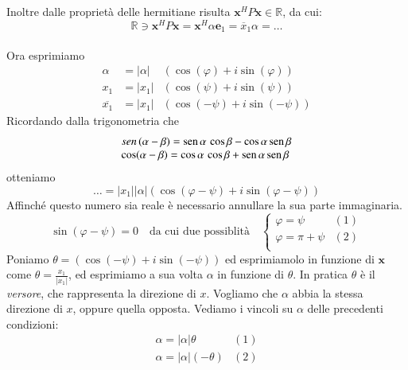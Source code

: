 Inoltre dalle propriet\`a delle hermitiane risulta $ \mathbf{x}^{H}P\mathbf{x} \in
\mathbb{R}$, da cui:
$$ \mathbb{R} \ni \mathbf{x}^{H}P\mathbf{x} = \mathbf{x}^{H} \alpha \mathbf{e}_1 = \overline{x}_1 \alpha = \ldots $$
                                                               \\
Ora esprimiamo
\[\begin{array}{rll}
 \alpha         & = |\alpha| &(\cos(\varphi) + i \sin (\varphi)) \\
 x_1            & = |x_1| &(\cos(\psi)      + i \sin (\psi))  \\
 \overline{x_1} & = |x_1| &(\cos(-\psi)    + i \sin (-\psi))
\end{array}\]
Ricordando dalla trigonometria che
$$
\begin{array}{l}
\mathbb \mathrm{sen} \, (\alpha - \beta)=\mathrm{sen} \, \alpha \, \cos\beta - \cos\alpha \, \mathrm{sen} \, \beta \\
\mathbb \cos(\alpha - \beta)=\cos\alpha \, \cos\beta + \mathrm{sen} \, \alpha \, \mathrm{sen} \, \beta   
\end{array}
$$
otteniamo
$$ \ldots = |x_1| |\alpha| (\cos(\varphi - \psi) + i \sin(\varphi - \psi))$$
Affinch\'e questo numero sia reale \`e necessario annullare la sua parte
immaginaria. \\
$$ \sin(\varphi - \psi) = 0 
\quad \text{da cui due possiblit\`a} \quad
\left\{
\begin{array}{ll}
  \varphi = \psi               & (1) \\
  \varphi = \pi  + \psi        & (2) \\
\end{array}
\right.
$$
Poniamo $\theta = (\cos(- \psi) + i \sin (-\psi))$ ed esprimiamolo in
funzione di $\mathbf{x}$ come $\theta = \frac{x_1}{|x_1|}$, ed esprimiamo a sua
volta $\alpha$ in funzione di $\theta$. In pratica $\theta$ \`e il \emph{versore}, che rappresenta la direzione di $x$. Vogliamo che $\alpha$ abbia la stessa
direzione di $x$, oppure quella opposta. Vediamo i vincoli su $\alpha$
delle precedenti condizioni:
\[\begin{array}{ll}
  \alpha  = |\alpha| \theta    & (1) \\
  \alpha  = |\alpha| (-\theta) & (2)
\end{array}\]


